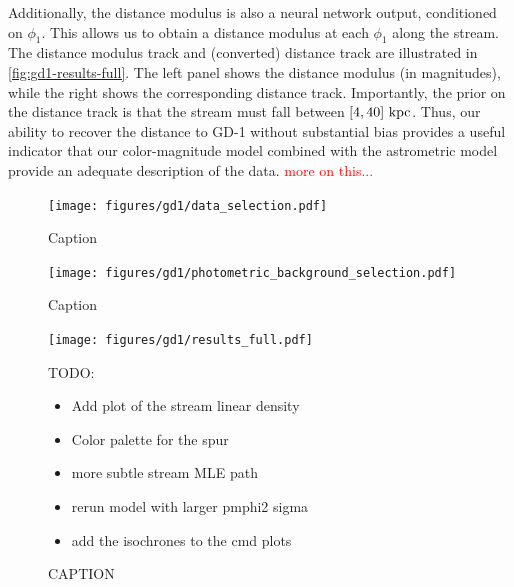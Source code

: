 \documentclass[twocolumn]{aastex631}
\newcommand{\TODO}[1]{{\textcolor{red}{#1}}}
\newcommand{\JN}[1]{\TODO{#1}}
\begin{document}
        Additionally, the distance modulus is also a neural network output,
        conditioned on $\phi_1$. This allows us to obtain a distance modulus at
        each $\phi_1$ along the stream. The distance modulus track and
        (converted) distance track are illustrated in
        \autoref{fig:gd1-results-full}. The left panel shows the distance
        modulus (in magnitudes), while the right shows the corresponding
        distance track. Importantly, the prior on the distance track is that the
        stream must fall between $[4,40]~\rm{kpc}$. Thus, our ability to recover
        the distance to GD-1 without substantial bias provides a useful
        indicator that our color-magnitude model combined with the astrometric
        model provide an adequate description of the data. \JN{more on this...}

        \begin{figure}[h]
            \centering
            \texttt{[image: figures/gd1/data\_selection.pdf]}
            \caption{Caption}
            \label{fig:gd1-data_selection}
        \end{figure}

        \begin{figure}
            \centering
            \texttt{[image: figures/gd1/photometric\_background\_selection.pdf]}
            \caption{Caption}
            \label{fig:gd1-photometric_background_selection}
        \end{figure}

        \begin{figure}[h]
            \centering
            \texttt{[image: figures/gd1/results\_full.pdf]}
            \caption{CAPTION}
            TODO:
            \begin{itemize}
                \item Add plot of the stream linear density
                \item Color palette for the spur
                \item more subtle stream MLE path
                \item rerun model with larger pmphi2 sigma
                \item add the isochrones to the cmd plots
            \end{itemize}
            \label{fig:gd1-results-full}
        \end{figure}
\end{document}
